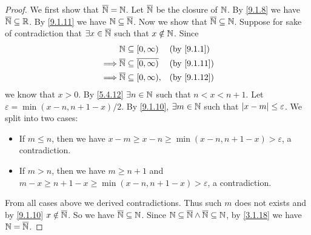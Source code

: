 \begin{proof}
	We first show that \(\overline{\mathbb{N}} = \mathbb{N}\).
	Let \(\overline{\mathbb{N}}\) be the closure of \(\mathbb{N}\).
	By \cref{9.1.8} we have \(\overline{\mathbb{N}} \subseteq \mathbb{R}\).
	By \cref{9.1.11} we have \(\mathbb{N} \subseteq \overline{\mathbb{N}}\).
	Now we show that \(\overline{\mathbb{N}} \subseteq \mathbb{N}\).
	Suppose for sake of contradiction that \(\exists x \in \overline{\mathbb{N}}\) such that \(x \notin \mathbb{N}\).
	Since
	\begin{align*}
		         & \N \subseteq [0, \infty)                       &  & \by{9.1.1}  \\
		\implies & \overline{\N} \subseteq \overline{[0, \infty)} &  & \by{9.1.11} \\
		\implies & \overline{\N} \subseteq [0, \infty),           &  & \by{9.1.12}
	\end{align*}
	we know that \(x > 0\).
	By \cref{5.4.12} \(\exists n \in \mathbb{N}\) such that \(n < x < n + 1\).
	Let \(\varepsilon = \min(x - n, n + 1 - x) / 2\).
	By \cref{9.1.10}, \(\exists m \in \mathbb{N}\) such that \(\left\lvert x - m\right\rvert \leq \varepsilon\).
	We split into two cases:
	\begin{itemize}
		\item If \(m \leq n\), then we have \(x - m \geq x - n \geq \min(x - n, n + 1 - x) > \varepsilon\), a contradiction.
		\item If \(m > n\), then we have \(m \geq n + 1\) and \(m - x \geq n + 1 - x \geq \min(x - n, n + 1 - x) > \varepsilon\), a contradiction.
	\end{itemize}
	From all cases above we derived contradictions.
	Thus such \(m\) does not exists and by \cref{9.1.10} \(x \notin \overline{\mathbb{N}}\).
	So we have \(\overline{\mathbb{N}} \subseteq \mathbb{N}\).
	Since \(\mathbb{N} \subseteq \overline{\mathbb{N}} \land \overline{\mathbb{N}} \subseteq \mathbb{N}\), by \cref{3.1.18} we have \(\mathbb{N} = \overline{\mathbb{N}}\).


\end{proof}
